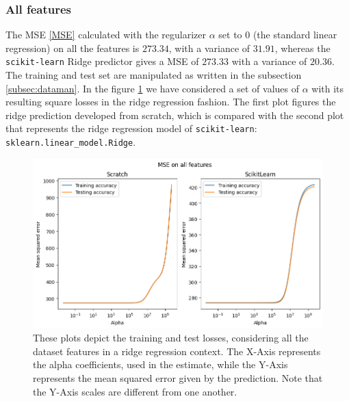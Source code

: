 \documentclass{article}
\begin{document}
\subsubsection{All features}
The MSE \eqref{MSE} calculated with the regularizer $\alpha$ set to $0$ (the standard linear regression) on all the features is $273.34$, with a variance of $31.91$, whereas the \texttt{scikit-learn} Ridge predictor gives a MSE of $273.33$ with a variance of $20.36$. The training and test set are manipulated as written in the subsection \ref{subsec:dataman}. In the figure \ref{rrmseall} we have considered a set of values of $\alpha$ with its resulting square losses in the ridge regression fashion. The first plot figures the ridge prediction developed from scratch, which is compared with the second plot that represents the ridge regression model of \texttt{scikit-learn}: \texttt{sklearn.linear\_model.Ridge}.
\begin{figure}[H]
	\begin{adjustwidth}{0 cm}{}
		\begin{center}
			\includegraphics[scale= 0.6]{images/MSE_all_vs.png}
		\end{center}
	\end{adjustwidth}
	\caption{These plots depict the training and test losses, considering all the dataset features in a ridge regression context. The X-Axis represents the alpha coefficients, used in the estimate, while the Y-Axis represents the mean squared error given by the prediction. Note that the Y-Axis scales are different from one another.}
	\label{rrmseall}
\end{figure}
\end{document}

